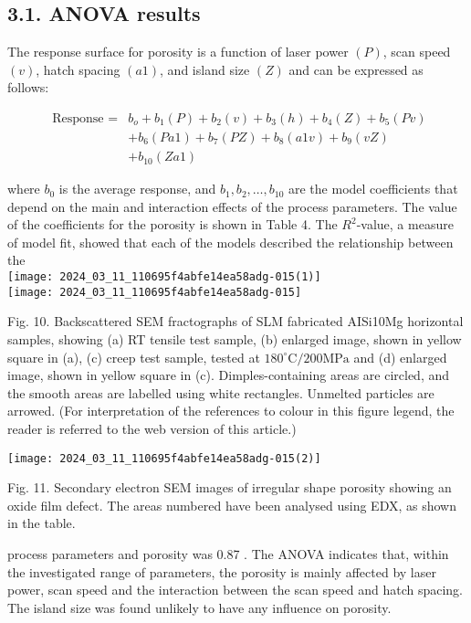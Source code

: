 \documentclass[10pt]{article}
\begin{document}
\subsection*{3.1. ANOVA results}
The response surface for porosity is a function of laser power $(P)$, scan speed $(v)$, hatch spacing $(a 1)$, and island size $(Z)$ and can be expressed as follows:


\begin{align*}
\text { Response }= & b_{o}+b_{1}(P)+b_{2}(v)+b_{3}(h)+b_{4}(Z)+b_{5}(P v) \\
& +b_{6}(P a 1)+b_{7}(P Z)+b_{8}(a 1 v)+b_{9}(v Z) \\
& +b_{10}(Z a 1) \tag{3}
\end{align*}


where $b_{0}$ is the average response, and $b_{1}, b_{2}, \ldots, b_{10}$ are the model coefficients that depend on the main and interaction effects of the process parameters. The value of the coefficients for the porosity is shown in Table 4. The $R^{2}$-value, a measure of model fit, showed that each of the models described the relationship between the\\
\texttt{[image: 2024\_03\_11\_110695f4abfe14ea58adg-015(1)]}\\
\texttt{[image: 2024\_03\_11\_110695f4abfe14ea58adg-015]}

Fig. 10. Backscattered SEM fractographs of SLM fabricated AISi10Mg horizontal samples, showing (a) RT tensile test sample, (b) enlarged image, shown in yellow square in (a), (c) creep test sample, tested at $180^{\circ} \mathrm{C} / 200 \mathrm{MPa}$ and (d) enlarged image, shown in yellow square in (c). Dimples-containing areas are circled, and the smooth areas are labelled using white rectangles. Unmelted particles are arrowed. (For interpretation of the references to colour in this figure legend, the reader is referred to the web version of this article.)

\begin{center}
\texttt{[image: 2024\_03\_11\_110695f4abfe14ea58adg-015(2)]}
\end{center}

Fig. 11. Secondary electron SEM images of irregular shape porosity showing an oxide film defect. The areas numbered have been analysed using EDX, as shown in the table.

process parameters and porosity was 0.87 . The ANOVA indicates that, within the investigated range of parameters, the porosity is mainly affected by laser power, scan speed and the interaction between the scan speed and hatch spacing. The island size was found unlikely to have any influence on porosity.
\end{document}
